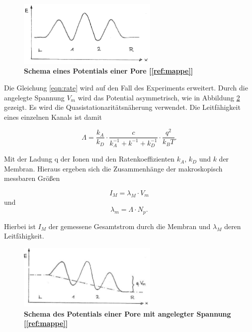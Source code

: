 \documentclass[a4paper,ngerman]{scrartcl}
\begin{document}
\begin{figure}[tb!]
\includegraphics[width=0.6\textwidth]{abbildungen/potential-einfach.png}
\caption{\textbf{Schema eines Potentials einer Pore [\ref{ref:mappe}]}}
\label{fig:potential-einfach}
\end{figure}


Die Gleichung \ref{eqn:rate} wird auf den Fall des Experiments erweitert. Durch die angelegte Spannung $V_{m}$ wird das Potential asymmetrisch, wie in Abbildung \ref{fig:potential-asym} gezeigt.  Es wird die Quasistationaritätsnäherung verwendet. Die Leitfähigkeit eines einzelnen Kanals ist damit

\begin{equation}
\Lambda = \frac{k_A}{k_D} \cdot \frac{c}{k_A^{-1}+k^{-1}+k_D^{-1}} \cdot  \frac{q^2}{k_B T} .
\end{equation}

Mit der Ladung q der Ionen und den Ratenkoeffizienten $k_A$, $k_D$ und $k$ der Membran.
Hieraus ergeben sich die Zusammenhänge der makroskopisch messbaren Größen

\begin{equation}
I_M = \lambda_M \cdot V_m
\end{equation}
und
\begin{equation}\label{eqn:transport-leitfaehigkeit}
\lambda_m = \Lambda \cdot N_p.
\end{equation}

Hierbei ist $I_M$ der gemessene Gesamtstrom durch die Membran und $\lambda_M$ deren Leitfähigkeit.


\begin{figure}[tb!]
\includegraphics[width=0.6\textwidth]{abbildungen/potential-asym.png}
\caption{\textbf{Schema des Potentials einer Pore mit angelegter Spannung [\ref{ref:mappe}]}}
\label{fig:potential-asym}
\end{figure}
\end{document}
